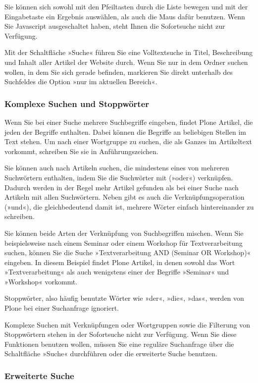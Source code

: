 \documentclass[a4paper,12pt,ngerman]{manual}
\begin{document}
Sie können sich sowohl mit den Pfeiltasten durch die Liste bewegen und
mit der Eingabetaste ein Ergebnis auswählen, als auch die Maus dafür
benutzen. Wenn Sie Javascript ausgeschaltet haben, steht Ihnen die
Sofortsuche nicht zur Verfügung.

Mit der Schaltfläche »Suche« führen Sie eine Volltextsuche in Titel,
Beschreibung und Inhalt aller Artikel der Website durch. Wenn Sie nur
in dem Ordner suchen wollen, in dem Sie sich gerade befinden,
markieren Sie direkt unterhalb des Suchfeldes die Option »nur im
aktuellen Bereich«.


\subsubsection{Komplexe Suchen und Stoppwörter}

Wenn Sie bei einer Suche mehrere Suchbegriffe eingeben, findet Plone
Artikel, die jeden der Begriffe enthalten. Dabei können die Begriffe
an beliebigen Stellen im Text stehen. Um nach einer Wortgruppe zu
suchen, die als Ganzes im Artikeltext vorkommt, schreiben Sie sie in
Anführungszeichen.

Sie können auch nach Artikeln suchen, die mindestens eines von
mehreren Suchwörtern enthalten, indem Sie die Suchwörter mit 
(»oder«) verknüpfen. Dadurch werden in der Regel mehr Artikel gefunden
als bei einer Suche nach Artikeln mit allen Suchwörtern. Neben 
gibt es auch die Verknüpfungsoperation  (»und«), die
gleichbedeutend damit ist, mehrere Wörter einfach hintereinander zu
schreiben.

Sie können beide Arten der Verknüpfung von Suchbegriffen mischen. Wenn
Sie beispielsweise nach einem Seminar oder einem Workshop für
Textverarbeitung suchen, können Sie die Suche »Textverarbeitung AND
(Seminar OR Workshop)« eingeben. In diesem Beispiel findet Plone
Artikel, in denen sowohl das Wort »Textverarbeitung« als auch
wenigstens einer der Begriffe »Seminar« und »Workshop« vorkommt.

Stoppwörter, also häufig benutzte Wörter wie »der«, »die«, »das«,
werden von Plone bei einer Suchanfrage ignoriert.

Komplexe Suchen mit Verknüpfungen oder Wortgruppen sowie die Filterung
von Stoppwörtern stehen in der Sofortsuche nicht zur Verfügung. Wenn
Sie diese Funktionen benutzen wollen, müssen Sie eine reguläre
Suchanfrage über die Schaltfläche »Suche« durchführen oder die
erweiterte Suche benutzen.


\subsubsection{Erweiterte Suche}
\end{document}
